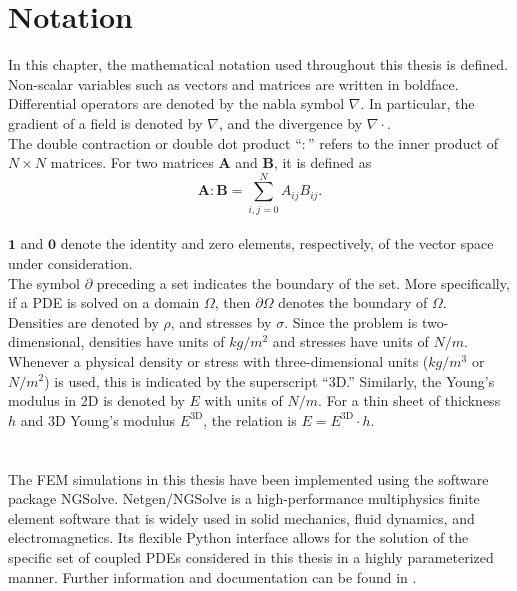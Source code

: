 \section{Notation}
In this chapter, the mathematical notation used throughout this thesis is defined.\\
Non-scalar variables such as vectors and matrices are written in boldface.\\
Differential operators are denoted by the nabla symbol $\nabla$. In particular, the gradient of a field is denoted by $\nabla$, and the divergence by $\nabla \cdot$.\\
The double contraction or double dot product ``$:$'' refers to the inner product of $N \times N$ matrices. For two matrices $\mathbf{A}$ and $\mathbf{B}$, it is defined as
\[
\mathbf{A}:\mathbf{B} = \sum_{i,j=0}^N A_{ij} B_{ij}.
\]\\
$\mathbf{1}$ and $\mathbf{0}$ denote the identity and zero elements, respectively, of the vector space under consideration.\\
The symbol $\partial$ preceding a set indicates the boundary of the set. More specifically, if a PDE is solved on a domain $\Omega$, then $\partial \Omega$ denotes the boundary of $\Omega$.\\
Densities are denoted by $\rho$, and stresses by $\sigma$. Since the problem is two-dimensional, densities have units of $kg/m^2$ and stresses have units of $N/m$. Whenever a physical density or stress with three-dimensional units ($kg/m^3$ or $N/m^2$) is used, this is indicated by the superscript ``3D.'' Similarly, the Young's modulus in 2D is denoted by $E$ with units of $N/m$. For a thin sheet of thickness $h$ and 3D Young's modulus $E^\mathrm{3D}$, the relation is $E = E^\mathrm{3D} \cdot h$.\\

\section{\ngsolve}
The FEM simulations in this thesis have been implemented using the software package NGSolve. Netgen/NGSolve is a high-performance multiphysics finite element software that is widely used in solid mechanics, fluid dynamics, and electromagnetics. Its flexible Python interface allows for the solution of the specific set of coupled PDEs considered in this thesis in a highly parameterized manner. Further information and documentation can be found in \cite{NGSolve}.\\

